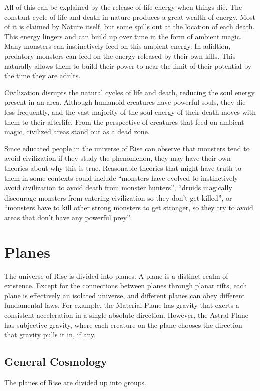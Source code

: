             All of this can be explained by the release of life energy when things die.
            The constant cycle of life and death in nature produces a great wealth of energy.
            Most of it is claimed by Nature itself, but some spills out at the location of each death.
            This energy lingers and can build up over time in the form of ambient magic.
            Many monsters can instinctively feed on this ambient energy.
            In adidtion, predatory monsters can feed on the energy released by their own kills.
            This naturally allows them to build their power to near the limit of their potential by the time they are adults.

            Civilization disrupts the natural cycles of life and death, reducing the soul energy present in an area.
            Although humanoid creatures have powerful souls, they die less frequently, and the vast majority of the soul energy of their death moves with them to their afterlife.
            From the perspective of creatures that feed on ambient magic, civilized areas stand out as a dead zone.

            Since educated people in the universe of Rise can observe that monsters tend to avoid civilization if they study the phenomenon, they may have their own theories about why this is true.
            Reasonable theories that might have truth to them in some contexts could include ``monsters have evolved to instinctively avoid civilization to avoid death from monster hunters'', ``druids magically discourage monsters from entering civilization so they don't get killed'', or ``monsters have to kill other strong monsters to get stronger, so they try to avoid areas that don't have any powerful prey''.

\section{Planes}\label{Planes}
    The universe of Rise is divided into planes.
    A plane is a distinct realm of existence.
    Except for the connections between planes through planar rifts, each plane is effectively an isolated universe, and different planes can obey different fundamental laws.
    For example, the Material Plane has gravity that exerts a consistent acceleration in a single absolute direction.
    However, the Astral Plane has subjective gravity, where each creature on the plane chooses the direction that gravity pulls it in, if any.

    \subsection{General Cosmology}
        The planes of Rise are divided up into groups.

